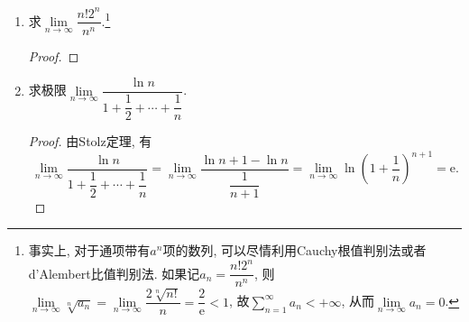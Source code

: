 \documentclass[a4paper,11pt,twoside]{ctexbook}
\newcommand{\e}{\mathrm e}
\begin{document}
\begin{enumerate}
\begin{proof}
		      由于$\lim\limits_{n\to\infty} \left(1+\dfrac{1}{n+1}\right)^n=\lim\limits_{n\to\infty} \left(1+\dfrac{1}{n}\right)^{n+1}=\e$, 即对于任意给定的$\varepsilon>0$, 存在$N\in\mathbf{N}_{+}$, 使得当$n>N$时有
		      \[
			      \left|\left(1+\dfrac{1}{n+1}\right)^n-\e\right|<\varepsilon \ \text{且}\ \left|\left(1+\dfrac{1}{n}\right)^{n+1}-\e\right|<\varepsilon.
		      \]
		      特别地, 当$n>N$时有
		      \[
			      \left(1+\dfrac{1}{n+1}\right)^n>\e-\varepsilon \ \text{且}\ \left(1+\dfrac{1}{n}\right)^{n+1}<\e+\varepsilon.
		      \]
		      由于$\lim\limits_{n\to\infty} p_n=+\infty$, 对于$N>0$, 存在$M\in\mathbf{N}_{+}$使得$n>M$时, $[p_n]>N$, 于是当$n>M$时, 就有
		      \[
			      \e-\varepsilon<\left(1+\dfrac{1}{[p_n]+1}\right)^{[p_n]}<\left(1+\dfrac{1}{p_n}\right)^{p_n}<\left(1+\dfrac{1}{[p_n]}\right)^{[p_n]+1}<\e+\varepsilon.
		      \]
		      即当$n>M$时$\left|\left(1+\dfrac{1}{p_n}\right)^{p_n}-e\right|<\varepsilon$, 所以$\lim\limits_{n\to\infty} \left(1+\dfrac{1}{p_n}\right)^{p_n}=\e$. \qedhere
	      \end{proof}
	\item 求$\lim\limits_{n\to\infty} \dfrac{n!2^n}{n^n}$.\footnote{事实上, 对于通项带有$a^n$项的数列, 可以尽情利用Cauchy根值判别法或者d'Alembert比值判别法. 如果记$a_n=\dfrac{n!2^n}{n^n}$, 则$\lim\limits_{n\to\infty} \sqrt[n]{a_n}=\lim\limits_{n\to\infty} \dfrac{2\sqrt[n]{n!}}{n}=\dfrac{2}{\e}<1$, 故$\sum\limits_{n=1}^{\infty}a_n<+\infty$, 从而$\lim\limits_{n\to\infty} a_n=0$.}
	      \begin{proof}

	      \end{proof}
	\item 求极限$\lim\limits_{n\to\infty} \dfrac{\ln{n}}{1+\dfrac{1}{2}+\cdots+\dfrac{1}{n}}$.
	      \begin{proof}
		      由Stolz定理, 有
		      \[
			      \lim\limits_{n\to\infty} \dfrac{\ln{n}}{1+\dfrac{1}{2}+\cdots+\dfrac{1}{n}}=\lim\limits_{n\to\infty} \dfrac{\ln{n+1}-\ln{n}}{\dfrac{1}{n+1}}=\lim\limits_{n\to\infty} \ln\left(1+\dfrac{1}{n}\right)^{n+1}=\e.
		      \]
	      \end{proof}


\end{enumerate}
\end{document}
